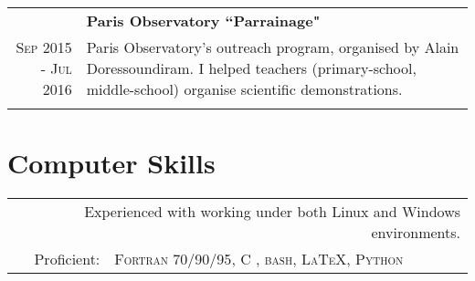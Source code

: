 \documentclass[10pt]{article} %
\begin{document}
\begin{tabular}{r|p{13.5cm}}
                             & \textbf{Paris Observatory ``Parrainage"}\\
\textsc{Sep 2015 - Jul 2016} & Paris Observatory's outreach program, organised by Alain Doressoundiram. I helped teachers (primary-school, middle-school) organise scientific demonstrations.\\
\multicolumn{2}{c}{} \\
\end{tabular}




\vspace{0.35 cm}
\section{Computer Skills}

\begin{tabular}{rp{13.5cm}}
\multicolumn{2}{p{14.5cm}}{Experienced with working under both Linux and Windows environments.}\\%
Proficient:  & \textsc{Fortran 70/90/95}, \textsc{C}
, \textsc{bash}, \textsc{LaTeX}, \textsc{Python} \\
\end{tabular}





%
%

\end{document}
